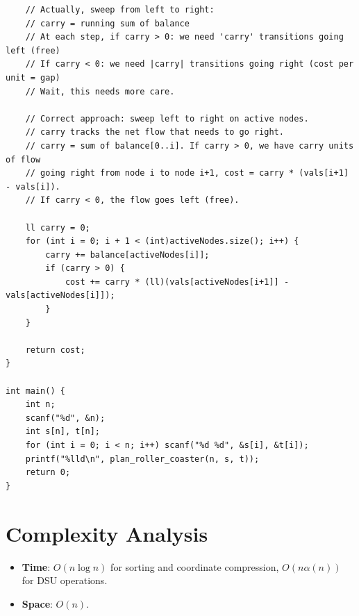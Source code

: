 \documentclass[11pt,a4paper]{article}
\begin{document}
\begin{lstlisting}
    // Actually, sweep from left to right:
    // carry = running sum of balance
    // At each step, if carry > 0: we need 'carry' transitions going left (free)
    // If carry < 0: we need |carry| transitions going right (cost per unit = gap)
    // Wait, this needs more care.

    // Correct approach: sweep left to right on active nodes.
    // carry tracks the net flow that needs to go right.
    // carry = sum of balance[0..i]. If carry > 0, we have carry units of flow
    // going right from node i to node i+1, cost = carry * (vals[i+1] - vals[i]).
    // If carry < 0, the flow goes left (free).

    ll carry = 0;
    for (int i = 0; i + 1 < (int)activeNodes.size(); i++) {
        carry += balance[activeNodes[i]];
        if (carry > 0) {
            cost += carry * (ll)(vals[activeNodes[i+1]] - vals[activeNodes[i]]);
        }
    }

    return cost;
}

int main() {
    int n;
    scanf("%d", &n);
    int s[n], t[n];
    for (int i = 0; i < n; i++) scanf("%d %d", &s[i], &t[i]);
    printf("%lld\n", plan_roller_coaster(n, s, t));
    return 0;
}
\end{lstlisting}

\section{Complexity Analysis}

\begin{itemize}
  \item \textbf{Time}: $O(n \log n)$ for sorting and coordinate compression, $O(n \alpha(n))$ for DSU operations.
  \item \textbf{Space}: $O(n)$.
\end{itemize}
\end{document}
